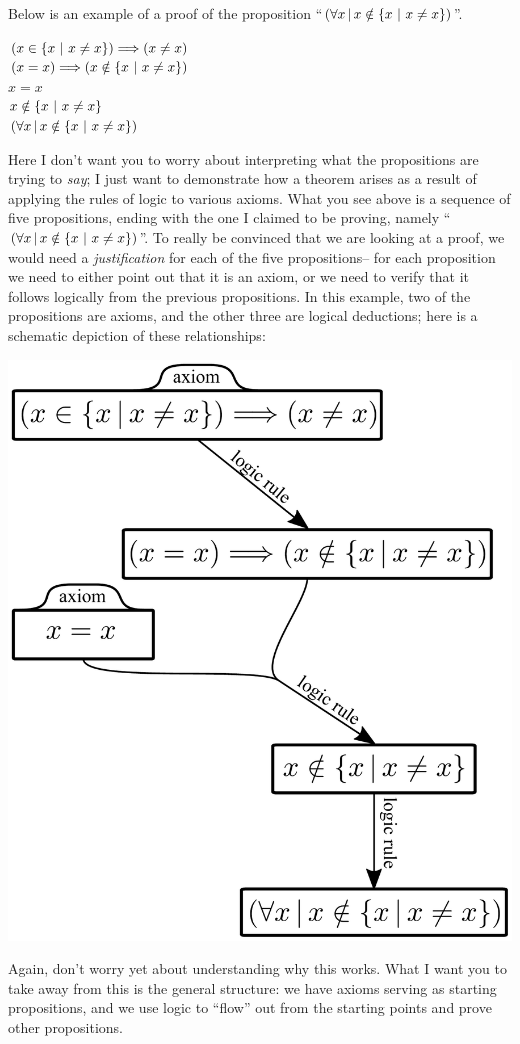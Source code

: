 \documentclass[12pt]{article}
\begin{document}
Below is an example of a proof of the proposition ``$(\forall x\,|\,x\notin\left\{ x\ |\ \text{$x\neq x$} \right\})$''.
\begin{adjustwidth}{1cm}{}
$(x\in\left\{ x\ |\ \text{$x\neq x$} \right\})\Longrightarrow (x\neq x)$\\ 
$(x=x)\Longrightarrow (x\notin \left\{ x\ |\ \text{$x\neq x$} \right\})$\\
$x=x$\\
$x\notin\left\{ x\ |\ \text{$x\neq x$} \right\}$\\
$(\forall x\,|\,x\notin\left\{ x\ |\ \text{$x\neq x$} \right\})$
\end{adjustwidth}
Here I don't want you to worry about interpreting what the propositions are trying to \emph{say};
I just want to demonstrate how a theorem arises as a result of applying the rules of logic
to various axioms. What you see above is a sequence of five propositions, ending with the
one I claimed to be proving, namely ``$(\forall x\,|\,x\notin\left\{ x\ |\ \text{$x\neq x$} \right\})$''.
To really be convinced that we are looking at a proof, we would need a \emph{justification}
for each of the five propositions-- for each proposition we need to either point out that it is
an axiom, or we need to verify that it follows logically from the previous propositions.
In this example, two of the propositions are axioms, and the other three are logical deductions;
here is a schematic depiction of these relationships:
\begin{center}
\includegraphics[scale=0.25]{proofFlow.pdf}
\end{center}
Again, don't worry yet about understanding why this works.
What I want you to take away from this is the general structure:
we have axioms serving as starting propositions, and we use logic to ``flow'' out from
the starting points and prove other propositions.
\end{document}
